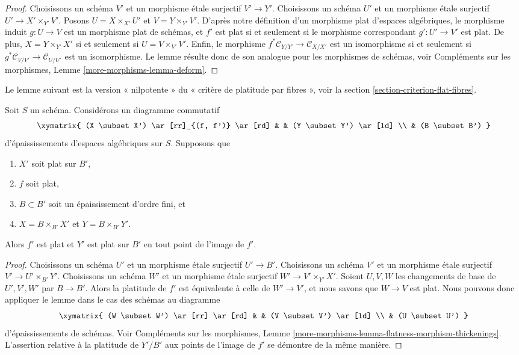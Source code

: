 \begin{proof}
Choisissons un schéma $V'$ et un morphisme étale surjectif $V' \to Y'$.
Choisissons un schéma $U'$ et un morphisme étale surjectif
$U' \to X' \times_{Y'} V'$. Posons $U = X \times_{X'} U'$ et
$V = Y \times_{Y'} V'$. D'après notre définition d'un morphisme plat
d'espaces algébriques, le morphisme induit $g : U \to V$ est un morphisme plat
de schémas, et $f'$ est plat si et seulement si le morphisme correspondant
$g' : U' \to V'$ est plat. De plus, $X = Y \times_{Y'} X'$ si et seulement
si $U = V \times_{V'} V'$. Enfin, le morphisme
$f^*\mathcal{C}_{Y/Y'} \to \mathcal{C}_{X/X'}$
est un isomorphisme si et seulement si
$g^*\mathcal{C}_{V/V'} \to \mathcal{C}_{U/U'}$ est un isomorphisme.
Le lemme résulte donc de son analogue pour les morphismes de schémas, voir
Compléments sur les morphismes, Lemme \ref{more-morphisms-lemma-deform}.
\end{proof}

\noindent
Le lemme suivant est la version « nilpotente » du
« critère de platitude par fibres », voir la
section \ref{section-criterion-flat-fibres}.

\begin{lemma}
\label{lemma-flatness-morphism-thickenings}
Soit $S$ un schéma. Considérons un diagramme commutatif
$$
\xymatrix{
(X \subset X') \ar[rr]_{(f, f')} \ar[rd] & & (Y \subset Y') \ar[ld] \\
& (B \subset B')
}
$$
d'épaississements d'espaces algébriques sur $S$. Supposons que
\begin{enumerate}
\item $X'$ soit plat sur $B'$,
\item $f$ soit plat,
\item $B \subset B'$ soit un épaississement d'ordre fini, et
\item $X = B \times_{B'} X'$ et $Y = B \times_{B'} Y'$.
\end{enumerate}
Alors $f'$ est plat et $Y'$ est plat sur $B'$ en tout point de
l'image de $f'$.
\end{lemma}

\begin{proof}
Choisissons un schéma $U'$ et un morphisme étale surjectif $U' \to B'$.
Choisissons un schéma $V'$ et un morphisme étale surjectif
$V' \to U' \times_{B'} Y'$.
Choisissons un schéma $W'$ et un morphisme étale surjectif
$W' \to V' \times_{Y'} X'$. Soient $U, V, W$ les changements de base
de $U', V', W'$ par $B \to B'$. Alors la platitude de $f'$ est
équivalente à celle de $W' \to V'$, et nous savons
que $W \to V$ est plat. Nous pouvons donc appliquer le lemme
dans le cas des schémas au diagramme
$$
\xymatrix{
(W \subset W') \ar[rr] \ar[rd] & & (V \subset V') \ar[ld] \\
& (U \subset U')
}
$$
d'épaississements de schémas. Voir
Compléments sur les morphismes, Lemme
\ref{more-morphisms-lemma-flatness-morphism-thickenings}.
L'assertion relative à la platitude de $Y'/B'$ aux points de
l'image de $f'$ se démontre de la même manière.
\end{proof}

